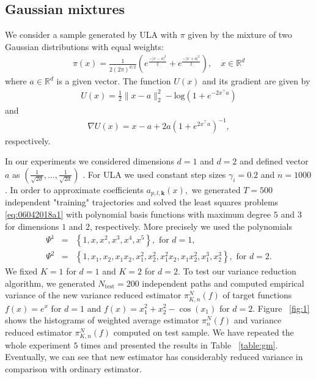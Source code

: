 \documentclass[article]{elsarticle}
\def\NtrainPath{T}
\begin{document}
\subsection{Gaussian mixtures}
 We consider a sample generated by ULA with $\pi$  given by the mixture of two Gaussian distributions  with equal weights:
\begin{eqnarray*}
\pi (x) = \frac{1}{2(2\pi)^{d/2}} \left( e ^{\frac{-| x-a|^2}{2}}  + e ^{\frac{-| x+a|^2}{2}} \right), \quad x \in\mathbb R^d
\end{eqnarray*}
where $a \in \mathbb{R}^d$ is a given vector. The function $U(x)$ and its gradient are given by
\begin{eqnarray*}
U(x) = \frac{1}{2} \|x - a\|_2^2 - \text{log}(1 + e^{-2x^\top a})
\end{eqnarray*}
and
\begin{eqnarray*}
\nabla U(x) = x-a +2a(1 + e^{2 x^\top a})^{-1},
\end{eqnarray*}
respectively.
\par
In our experiments we considered dimensions $d = 1$ and $d = 2$ and defined vector $a$ as $(\frac{1}{\sqrt{2d}}, \dots, \frac{1}{\sqrt{2d}})$ . For ULA  we used constant step sizes $\gamma_i = 0.2$ and $n=1000$. In order to approximate coefficients $a_{p,l,\mathbf{k}}(x),$ we generated $\NtrainPath = 500$ independent "training" trajectories and solved the least squares  problems \eqref{eq:06042018a1} with polynomial basis functions with maximum degree \(5\) and \(3\) for dimensions \(1\) and \(2\), respectively. More precisely we used the polynomials
\begin{eqnarray*}
\Psi^1 &=& \left\{1,x,x^2,x^3,x^4,x^5 \right\}, \text{ for } d = 1, \\
\Psi^2 &=& \left\{1,x_1,x_2,x_1 x_2,x_1^2,x_2^2, x_1^2 x_2,x_1x_2^2,x_1^3,x_2^3 \right\}, \text{ for }  d = 2.
\end{eqnarray*}
We fixed \(K = 1\) for \(d=1\) and \(K=2\) for \(d = 2\). To test our variance reduction algorithm, we generated $N_{\mathrm{test}} = 200$ independent paths and computed empirical variance of the new variance reduced estimator $\pi_{K,n}^N(f)$ of target functions $f(x) = e^x$ for $d = 1$ and $f(x) = x_1^2 + x_2^2 - \cos(x_1)$ for $d = 2$.
Figure ~\ref{fig:1} shows the histograms of weighted average estimator \(\pi_{n}^N(f)\) and variance reduced estimator \(\pi_{K,n}^N(f)\) computed on test sample. We have repeated the whole experiment \(5\) times and presented the results in Table ~\ref{table:gm}. Eventually, we can see that new estimator has considerably reduced variance in comparison with ordinary estimator.
\end{document}
